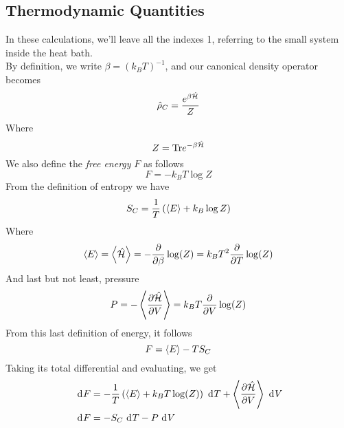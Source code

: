 \documentclass[../qm.tex]{subfiles}
\begin{document}
		\subsection{Thermodynamic Quantities}
		In these calculations, we'll leave all the indexes 1, referring to the small system inside the heat bath.\\
		By definition, we write $\beta=(k_BT)^{-1}$, and our canonical density operator becomes
		\begin{equation}
			\hat{\rho}_C=\frac{e^{\beta\hat{\mathcal{H}}}}{Z}
			\label{eq:canonicalmatrix}
		\end{equation}
		Where
		\begin{equation}
			Z=\mathrm{Tr} e^{-\beta\hat{\mathcal{H}}}
			\label{eq:partitionfunctioncanonicalthermodynamics}
		\end{equation}
		We also define the \textit{free energy} $F$ as follows
		\begin{equation}
			F=-k_BT\log Z
			\label{eq:freeenergy}
		\end{equation}
		From the definition of entropy we have
		\begin{equation}
			S_C=\frac{1}{T}\left( \expval{E}+k_B\log Z \right)
			\label{eq:entropy}
		\end{equation}
		Where
		\begin{equation}
			\expval{E}=\expval{\hat{\mathcal{H}}}=-\pdv{\beta}\log(Z)=k_BT^2\pdv{T}\log(Z)
			\label{eq:energyaverage}
		\end{equation}
		And last but not least, pressure
		\begin{equation}
			P=-\expval{\pdv{\hat{\mathcal{H}}}{V}}=k_BT\pdv{V}\log(Z)
			\label{eq:pressurecanonical}
		\end{equation}
		From this last definition of energy, it follows
		\begin{equation}
			F=\expval{E}-TS_C
			\label{eq:freeenergy2}
		\end{equation}
		Taking its total differential and evaluating, we get
		\begin{equation}
			\begin{aligned}
				\ \mathrm{d}^{}F&=-\frac{1}{T}\left( \expval{E}+k_BT\log(Z) \right)\ \mathrm{d}^{}T+\expval{\pdv{\hat{\mathcal{H}}}{V}}\ \mathrm{d}^{}V\\
				\ \mathrm{d}^{}F&=-S_C\ \mathrm{d}^{}T-P\ \mathrm{d}^{}V
			\end{aligned}
			\label{eq:freenergy3}
		\end{equation}
\end{document}
